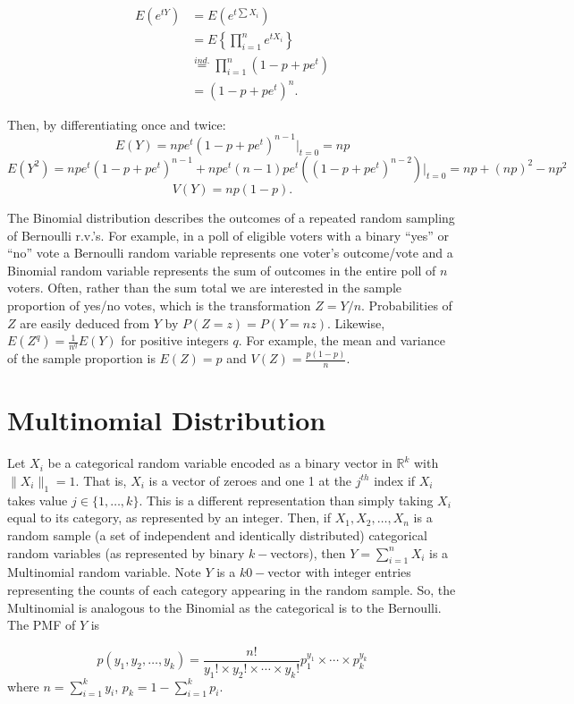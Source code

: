 \documentclass[]{book}
\begin{document}
\begin{align*}
E(e^{tY}) & = E(e^{t\sum X_i}) \\
& = E\left\{\prod_{i=1}^n e^{t X_i}\right\}\\
& \stackrel{ind.}{=} \prod_{i=1}^n (1-p + pe^t)\\
& = (1-p + pe^t)^n.
\end{align*}

Then, by differentiating once and twice:
\[E(Y) = npe^t(1-p + pe^t)^{n-1}|_{t=0} = np\]
\[E(Y^2) = npe^t(1-p + pe^t)^{n-1} + npe^t(n-1)pe^t((1-p + pe^t)^{n-2})|_{t=0} = np+(np)^2-np^2\]
\[V(Y) = np(1-p).\]

The Binomial distribution describes the outcomes of a repeated random
sampling of Bernoulli r.v.'s. For example, in a poll of eligible voters
with a binary ``yes'' or ``no'' vote a Bernoulli random variable
represents one voter's outcome/vote and a Binomial random variable
represents the sum of outcomes in the entire poll of \(n\) voters.
Often, rather than the sum total we are interested in the sample
proportion of yes/no votes, which is the transformation \(Z = Y/n\).
Probabilities of \(Z\) are easily deduced from \(Y\) by
\(P(Z = z) = P(Y = nz)\). Likewise, \(E(Z^q) = \frac{1}{n^q}E(Y)\) for
positive integers \(q\). For example, the mean and variance of the
sample proportion is \(E(Z) = p\) and \(V(Z) = \frac{p(1-p)}{n}\).

\section{Multinomial Distribution}\label{multinomial-distribution}

Let \(X_i\) be a categorical random variable encoded as a binary vector
in \(\mathbb{R}^k\) with \(\|X_i\|_1 = 1\). That is, \(X_i\) is a vector
of zeroes and one 1 at the \(j^{th}\) index if \(X_i\) takes value
\(j \in \{1,\ldots, k\}\). This is a different representation than
simply taking \(X_i\) equal to its category, as represented by an
integer. Then, if \(X_1, X_2, \ldots, X_n\) is a random sample (a set of
independent and identically distributed) categorical random variables
(as represented by binary \(k-\)vectors), then \(Y = \sum_{i=1}^n X_i\)
is a Multinomial random variable. Note \(Y\) is a \(k0-\)vector with
integer entries representing the counts of each category appearing in
the random sample. So, the Multinomial is analogous to the Binomial as
the categorical is to the Bernoulli. The PMF of \(Y\) is

\[p(y_1, y_2, \ldots, y_{k}) = \frac{n!}{y_1!\times y_2!\times \cdots \times y_k!}p_1^{y_1}\times \cdots \times p_k^{y_k}\]
where \(n = \sum_{i=1}^k y_i\), \(p_k = 1 - \sum_{i=1}^k p_i\).
\end{document}
